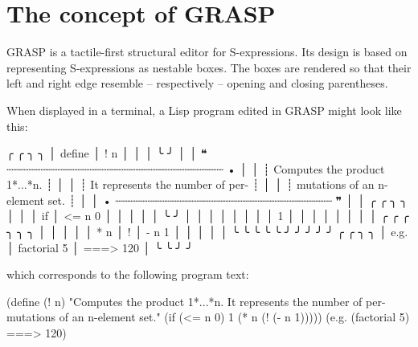\documentclass[sigconf]{acmart}
\newenvironment{Snippet}{\Verbatim[samepage=true]}{\endVerbatim}
\begin{document}


\maketitle

\section{The concept of GRASP}

GRASP is a tactile-first structural editor for S-expressions.
Its design is based on representing S-expressions as
nestable boxes. The boxes are rendered so that their left 
and right edge resemble -- respectively -- opening and closing 
parentheses.

When displayed in a terminal, a Lisp program edited in GRASP
might look like this:

\begin{Snippet}
╭        ╭     ╮                       ╮
│ define │ ! n │                       │
│        ╰     ╯                       │
│ ❝ ┈┈┈┈┈┈┈┈┈┈┈┈┈┈┈┈┈┈┈┈┈┈┈┈┈┈┈┈┈┈┈┈ • │
│ ┊ Computes the product 1*...*n.    ┊ │
│ ┊ It represents the number of per- ┊ │
│ ┊ mutations of an n-element set.   ┊ │
│ • ┈┈┈┈┈┈┈┈┈┈┈┈┈┈┈┈┈┈┈┈┈┈┈┈┈┈┈┈┈┈┈┈ ❞ │
│   ╭    ╭        ╮                 ╮  │
│   │ if │ <= n 0 │                 │  │
│   │    ╰        ╯                 │  │
│   │                               │  │
│   │       1                       │  │
│   │                               │  │
│   │       ╭     ╭   ╭       ╮ ╮ ╮ │  │
│   │       │ * n │ ! │ - n 1 │ │ │ │  │
╰   ╰       ╰     ╰   ╰       ╯ ╯ ╯ ╯  ╯
╭      ╭             ╮          ╮       
│ e.g. │ factorial 5 │ ===> 120 │       
╰      ╰             ╯          ╯       
\end{Snippet}

which corresponds to the following program text:

\begin{Snippet}
(define (! n)
"Computes the product 1*...*n.
It represents the number of per-
mutations of an n-element set."
  (if (<= n 0)
      1
      (* n (! (- n 1))))) 
(e.g. (factorial 5) ===> 120)
\end{Snippet}
\end{document}
